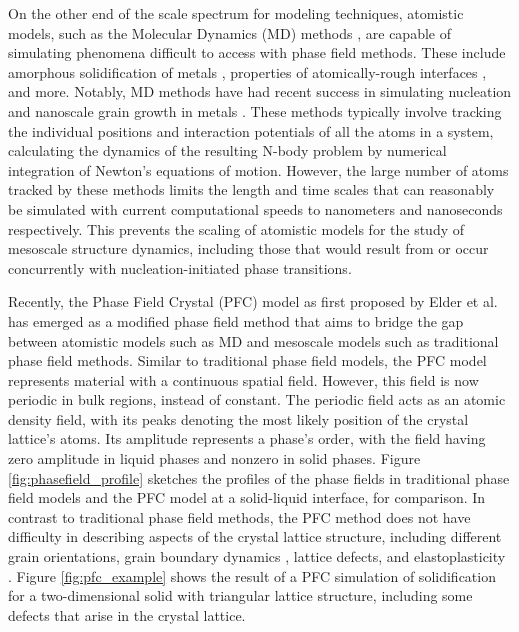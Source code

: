 On the other end of the scale spectrum for modeling techniques, atomistic models, such as the Molecular Dynamics (MD) methods \cite{alder59,rapaport_md}, are capable of simulating phenomena difficult to access with phase field methods. These include amorphous solidification of metals \cite{ozgen04,tian08}, properties of atomically-rough interfaces \cite{hoyt01}, and more. Notably, MD methods have had recent success in simulating nucleation and nanoscale grain growth in metals \cite{shibuta15}. These methods typically involve tracking the individual positions and interaction potentials of all the atoms in a system, calculating the dynamics of the resulting N-body problem by numerical integration of Newton's equations of motion. However, the large number of atoms tracked by these methods limits the length and time scales that can reasonably be simulated with current computational speeds to nanometers and nanoseconds respectively. This prevents the scaling of atomistic models for the study of mesoscale structure dynamics, including those that would result from or occur concurrently with nucleation-initiated phase transitions.

Recently, the Phase Field Crystal (PFC) model as first proposed by Elder et al. \cites{elder02,provatas07,emmerich12,humadi13,provatas_PFC} has emerged as a modified phase field method that aims to bridge the gap between atomistic models such as MD and mesoscale models such as traditional phase field methods. Similar to traditional phase field models, the PFC model represents material with a continuous spatial field. However, this field is now periodic in bulk regions, instead of constant. The periodic field acts as an atomic density field, with its peaks denoting the most likely position of the crystal lattice's atoms. Its amplitude represents a phase's order, with the field having zero amplitude in liquid phases and nonzero in solid phases. Figure \ref{fig:phasefield_profile} sketches the profiles of the phase fields in traditional phase field models and the PFC model at a solid-liquid interface, for comparison. In contrast to traditional phase field methods, the PFC method does not have difficulty in describing aspects of the crystal lattice structure, including different grain orientations, grain boundary dynamics \cite{elder08}, lattice defects, and elastoplasticity \cite{elder02,humadi13}. Figure \ref{fig:pfc_example} shows the result of a PFC simulation of solidification for a two-dimensional solid with triangular lattice structure, including some defects that arise in the crystal lattice.

